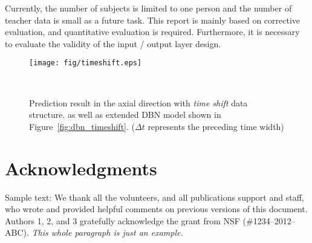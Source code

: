 \documentclass{sigchi}
\begin{document}
Currently, the number of subjects is limited to one person and the number of teacher data is small as a future task. This report is mainly based on corrective evaluation, and quantitative evaluation is required. Furthermore, it is necessary to evaluate the validity of the input / output layer design.

\begin{figure*}
\centering
  \texttt{[image: fig/timeshift.eps]}
  \caption{Prediction result in the axial direction with \textit{time shift} data structure. as well as extended DBN model shown in Figure~\ref{fig:dbn_timeshift}. ($ \Delta t $ represents the preceding time width)}
  ~\label{fig:timeshift}
\end{figure*}



\section{Acknowledgments}
%
Sample text: We thank all the volunteers, and all publications support
and staff, who wrote and provided helpful comments on previous
versions of this document. Authors 1, 2, and 3 gratefully acknowledge
the grant from NSF (\#1234--2012--ABC). \textit{This whole paragraph is
  just an example.}


\end{document}
